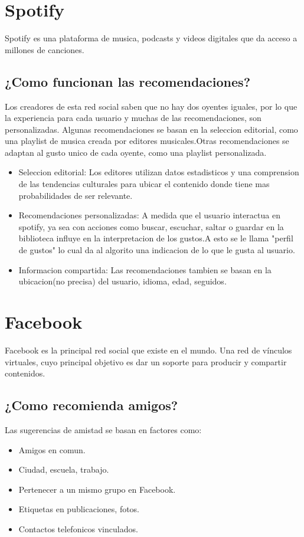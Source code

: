 \section{{\textbf{Spotify}}}
Spotify es una plataforma de musica, podcasts y videos digitales que da acceso a millones de canciones.
\subsection*{¿Como funcionan las recomendaciones?}
Los creadores de esta red social saben que no hay dos oyentes iguales, por lo que la experiencia para cada usuario y muchas de las recomendaciones, son personalizadas.
Algunas recomendaciones se basan en la seleccion editorial, como una playlist de musica creada por editores musicales.Otras recomendaciones se adaptan al gusto unico de cada oyente, como una playlist personalizada.
\begin{itemize}
    \item Seleccion editorial:
    Los editores utilizan datos estadisticos y una comprension de las tendencias culturales para ubicar el contenido donde tiene mas probabilidades de ser relevante.
    \item Recomendaciones personalizadas:
    A medida que el usuario interactua en spotify, ya sea con acciones como buscar, escuchar, saltar o guardar en la biblioteca influye en la interpretacion de los gustos.A esto se le llama "perfil de gustos" lo cual da al algorito una indicacion de lo que le gusta al usuario.
    \item Informacion compartida:
    Las recomendaciones tambien se basan en la ubicacion(no precisa) del usuario, idioma, edad, seguidos.
\end{itemize}

\section{{\textbf{Facebook}}}
Facebook es la principal red social que existe en el mundo. Una red de vínculos virtuales, cuyo principal objetivo es dar un soporte para producir y compartir contenidos. 
\subsection*{¿Como recomienda amigos?}
Las sugerencias de amistad se basan en factores como:
\begin{itemize}
    \item Amigos en comun.
    \item Ciudad, escuela, trabajo.
    \item Pertenecer a un mismo grupo en Facebook.
    \item Etiquetas en publicaciones, fotos.
    \item Contactos telefonicos vinculados.
\end{itemize}


